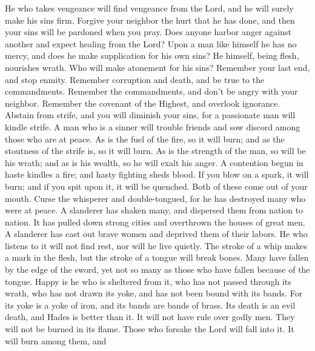  He who takes vengeance will find vengeance from the Lord,
and he will surely make his sins firm.  Forgive your
neighbor the hurt that he has done, and then your sins will be pardoned
when you pray.  Does anyone harbor anger against another
and expect healing from the Lord?  Upon a man like himself
he has no mercy, and does he make supplication for his own sins?
 He himself, being flesh, nourishes wrath. Who will make
atonement for his sins?  Remember your last end, and stop
enmity. Remember corruption and death, and be true to the commandments.
 Remember the commandments, and don't be angry with your
neighbor. Remember the covenant of the Highest, and overlook ignorance.
 Abstain from strife, and you will diminish your sins, for
a passionate man will kindle strife.  A man who is a
sinner will trouble friends and sow discord among those who are at
peace.  As is the fuel of the fire, so it will burn; and
as the stoutness of the strife is, so it will burn. As is the strength
of the man, so will be his wrath; and as is his wealth, so he will exalt
his anger.  A contention begun in haste kindles a fire;
and hasty fighting sheds blood.  If you blow on a spark,
it will burn; and if you spit upon it, it will be quenched. Both of
these come out of your mouth.  Curse the whisperer and
double-tongued, for he has destroyed many who were at peace.
 A slanderer has shaken many, and dispersed them from
nation to nation. It has pulled down strong cities and overthrown the
houses of great men.  A slanderer has cast out brave
women and deprived them of their labors.  He who listens
to it will not find rest, nor will he live quietly.  The
stroke of a whip makes a mark in the flesh, but the stroke of a tongue
will break bones.  Many have fallen by the edge of the
sword, yet not so many as those who have fallen because of the tongue.
 Happy is he who is sheltered from it, who has not passed
through its wrath, who has not drawn its yoke, and has not been bound
with its bands.  For its yoke is a yoke of iron, and its
bands are bands of brass.  Its death is an evil death,
and Hades is better than it.  It will not have rule over
godly men. They will not be burned in its flame.  Those
who forsake the Lord will fall into it. It will burn among them, and
